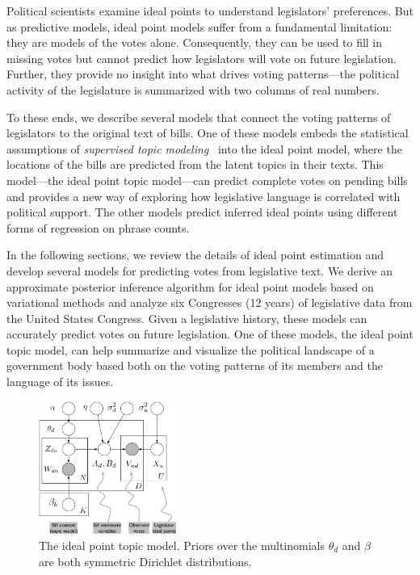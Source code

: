 Political scientists examine ideal points to understand legislators'
preferences.
But as predictive models, ideal point models suffer from a
fundamental limitation: they are models of the votes alone.
Consequently, they can be used to fill in missing votes but cannot
predict how legislators will vote on future legislation.  Further,
they provide no insight into what drives voting patterns---the
political activity of the legislature is summarized with two columns
of real numbers.

To these ends, we describe several models that connect the voting
patterns of legislators to the original text of bills.  One of these
models embeds the statistical assumptions of \textit{supervised topic
modeling}~\cite{blei:2008} into the ideal point model, where the
locations of the bills are predicted from the latent topics in their
texts. This model---the ideal point topic model---can predict complete
votes on pending bills and provides a new way of exploring how
legislative language is correlated with political support.  The other
models predict inferred ideal points using different forms of
regression on phrase counts.

In the following sections, we review the details of ideal point
estimation and develop several models for predicting votes from
legislative text.  We derive an approximate posterior inference
algorithm for ideal point models based on variational methods and
analyze six Congresses (12 years) of legislative data from the United
States Congress.  Given a legislative history, these models can
accurately predict votes on future legislation.  One of these models,
the ideal point topic model, can help summarize and visualize the
political landscape of a government body based both on the voting
patterns of its members and the language of its issues.

\begin{figure}[t]
\includegraphics[width=0.4\textwidth]{chapter_spatial_voting_with_text/figures/ideal-point-topic-model.pdf}
\caption{The ideal point topic model.  Priors over the multinomials
$\theta_d$ and $\beta$ are both symmetric Dirichlet distributions.}
\label{fig:legis_gm}
\end{figure}

